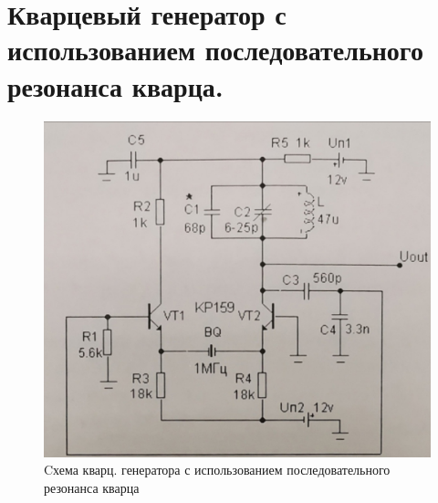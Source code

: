 \section{Кварцевый генератор с использованием последовательного резонанса кварца.}

\begin{figure}[h!]
    \centering
    \includegraphics[width=0.8\linewidth]{pics/schm2.jpg}
    \caption{Cхема кварц. генератора с использованием последовательного резонанса кварца}
    \label{graph}
\end{figure}

